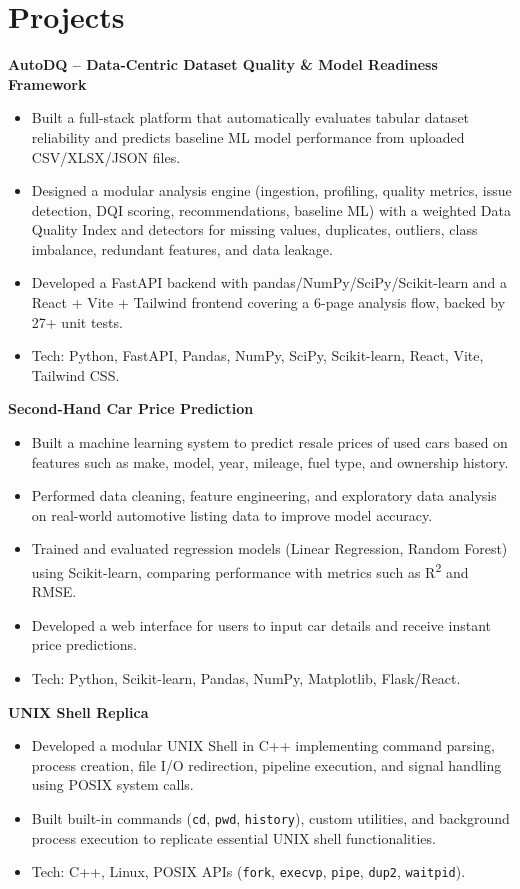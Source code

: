 \documentclass[10pt,a4paper]{article}
\begin{document}
\section*{Projects}

\textbf{AutoDQ -- Data-Centric Dataset Quality \& Model Readiness Framework}

\begin{itemize}
\item Built a full-stack platform that automatically evaluates tabular dataset reliability and predicts baseline ML model performance from uploaded CSV/XLSX/JSON files.
\item Designed a modular analysis engine (ingestion, profiling, quality metrics, issue detection, DQI scoring, recommendations, baseline ML) with a weighted Data Quality Index and detectors for missing values, duplicates, outliers, class imbalance, redundant features, and data leakage.
\item Developed a FastAPI backend with pandas/NumPy/SciPy/Scikit-learn and a React + Vite + Tailwind frontend covering a 6-page analysis flow, backed by 27+ unit tests.
\item Tech: Python, FastAPI, Pandas, NumPy, SciPy, Scikit-learn, React, Vite, Tailwind CSS.
\end{itemize}

\textbf{Second-Hand Car Price Prediction}

\begin{itemize}
\item Built a machine learning system to predict resale prices of used cars based on features such as make, model, year, mileage, fuel type, and ownership history.
\item Performed data cleaning, feature engineering, and exploratory data analysis on real-world automotive listing data to improve model accuracy.
\item Trained and evaluated regression models (Linear Regression, Random Forest) using Scikit-learn, comparing performance with metrics such as R\textsuperscript{2} and RMSE.
\item Developed a web interface for users to input car details and receive instant price predictions.
\item Tech: Python, Scikit-learn, Pandas, NumPy, Matplotlib, Flask/React.
\end{itemize}

\textbf{UNIX Shell Replica}

\begin{itemize}
\item Developed a modular UNIX Shell in C++ implementing command parsing, process creation, file I/O redirection, pipeline execution, and signal handling using POSIX system calls.
\item Built built-in commands (\texttt{cd}, \texttt{pwd}, \texttt{history}), custom utilities, and background process execution to replicate essential UNIX shell functionalities.
\item Tech: C++, Linux, POSIX APIs (\texttt{fork}, \texttt{execvp}, \texttt{pipe}, \texttt{dup2}, \texttt{waitpid}).
\end{itemize}
\end{document}
